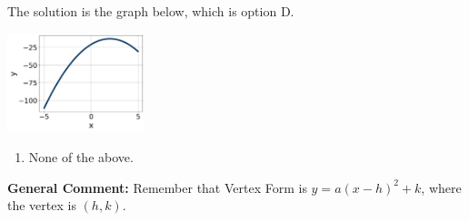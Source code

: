 \documentclass{extbook}[14pt]
\begin{document}
\begin{enumerate}
{The solution is the graph below, which is option D.
\begin{center}
    \includegraphics[width=0.3\textwidth]{../Figures/quadraticEquationToGraphDC.png}
\end{center}\begin{enumerate}[label=\Alph*.]
\item None of the above.\end{enumerate}
\textbf{General Comment:} Remember that Vertex Form is $y = a(x-h)^2+k$, where the vertex is $(h, k)$.
}
\end{enumerate}
\end{document}
